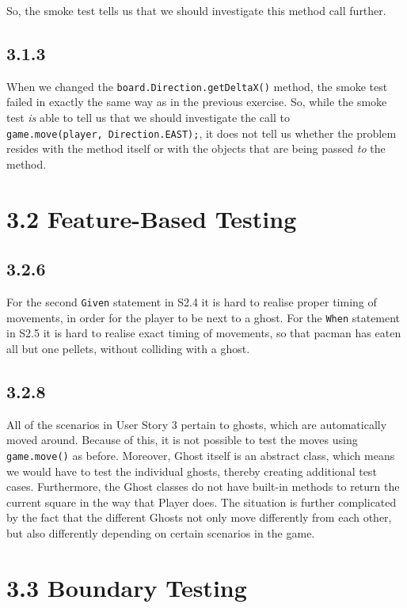 \documentclass[]{article}
\begin{document}
So, the smoke test tells us that we should investigate this method call
further.

\subsection{3.1.3}\label{section-2}

When we changed the \texttt{board.Direction.getDeltaX()} method, the
smoke test failed in exactly the same way as in the previous exercise.
So, while the smoke test \emph{is} able to tell us that we should
investigate the call to \texttt{game.move(player,\ Direction.EAST);}, it
does not tell us whether the problem resides with the method itself or
with the objects that are being passed \emph{to} the method.

\section{3.2 Feature-Based Testing}\label{feature-based-testing}

\subsection{3.2.6}\label{section-3}

For the second \texttt{Given} statement in S2.4 it is hard to realise
proper timing of movements, in order for the player to be next to a
ghost. For the \texttt{When} statement in S2.5 it is hard to realise
exact timing of movements, so that pacman has eaten all but one pellets,
without colliding with a ghost.

\subsection{3.2.8}\label{section-4}

All of the scenarios in User Story 3 pertain to ghosts, which are
automatically moved around. Because of this, it is not possible to test
the moves using \texttt{game.move()} as before. Moreover, Ghost itself
is an abstract class, which means we would have to test the individual
ghosts, thereby creating additional test cases. Furthermore, the Ghost
classes do not have built-in methods to return the current square in the
way that Player does. The situation is further complicated by the fact
that the different Ghosts not only move differently from each other, but
also differently depending on certain scenarios in the game.

\section{3.3 Boundary Testing}\label{boundary-testing}
\end{document}
